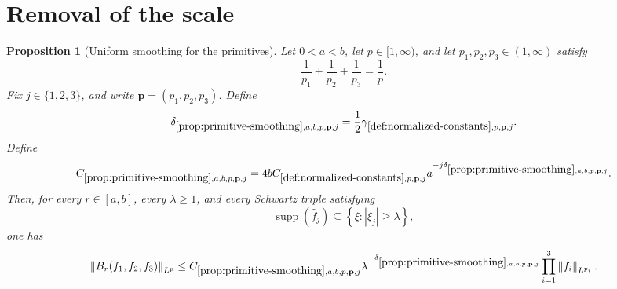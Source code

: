 \documentclass[11pt]{article}
\newtheorem{proposition}[theorem]{Proposition}
\newcommand{\supp}{\operatorname{supp}}
\newcommand{\norm}[2]{\left\lVert #1\right\rVert_{#2}}
\newcommand{\Cst}[2]{C_{\ref{#1},#2}}
\newcommand{\Exp}[2]{\delta_{\ref{#1},#2}}
\newcommand{\Gam}[2]{\gamma_{\ref{#1},#2}}
\newcommand{\abs}[1]{\left|#1\right|}
\newcommand{\set}[1]{\left\{#1\right\}}
\newcommand{\indices}{\{1,2,3\}}
\begin{document}
\section{Removal of the scale}

\begin{proposition}[Uniform smoothing for the primitives]\label{prop:primitive-smoothing}
Let \(0<a<b\), let \(p\in[1,\infty)\), and let \(p_1,p_2,p_3\in(1,\infty)\) satisfy
\[
\frac1{p_1}+\frac1{p_2}+\frac1{p_3}=\frac1p.
\]
Fix \(j\in\indices\), and write \(\mathbf p=(p_1,p_2,p_3)\).  Define
\[
\Exp{prop:primitive-smoothing}{a,b,p,\mathbf p,j}
=
\frac12\Gam{def:normalized-constants}{p,\mathbf p,j}.
\]
Define
\[
\Cst{prop:primitive-smoothing}{a,b,p,\mathbf p,j}
=
4b\Cst{def:normalized-constants}{p,\mathbf p,j}
a^{-j\Exp{prop:primitive-smoothing}{a,b,p,\mathbf p,j}}.
\]
Then, for every \(r\in[a,b]\), every \(\lambda\geq1\), and every Schwartz triple satisfying
\[
\supp(\widehat f_j)\subseteq\set{\xi:\abs{\xi_j}\geq\lambda},
\]
one has
\[
\norm{B_r(f_1,f_2,f_3)}{L^p}
\leq
\Cst{prop:primitive-smoothing}{a,b,p,\mathbf p,j}
\lambda^{-\Exp{prop:primitive-smoothing}{a,b,p,\mathbf p,j}}
\prod_{i=1}^{3}\norm{f_i}{L^{p_i}}.
\]
\end{proposition}
\end{document}
